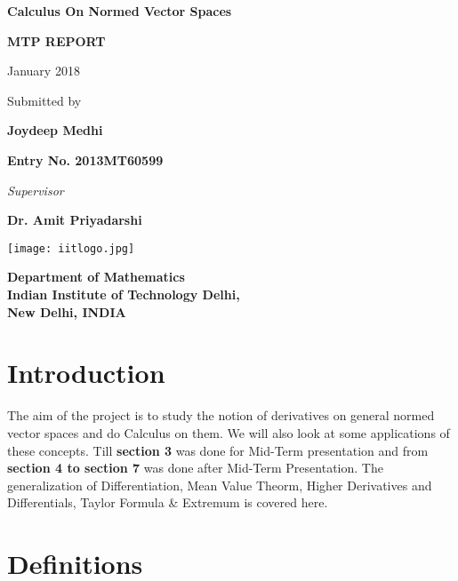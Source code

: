 \documentclass[11 pt]{article}
\theoremstyle{definition}
\theoremstyle{remark}
\begin{document}
\begin{center}
\begin{LARGE}
\textbf {Calculus On Normed Vector Spaces}
\end{LARGE}
\begin{center}
\end{center}
{\begin{Large}
\textbf{MTP REPORT} \\
\end{Large}}
January 2018
\end{center}

\vspace{45mm}
\begin{center}
Submitted by


\textbf{Joydeep Medhi}

\bf Entry No. 2013MT60599
\vspace{15mm}

\textit{Supervisor}

\textbf{Dr. Amit Priyadarshi}

\end{center}
\vspace{3cm}
\begin{center}
\texttt{[image: iitlogo.jpg]}
\end{center}
\begin{center}
\textbf{{Department of Mathematics\\
Indian Institute of Technology Delhi,\\
New Delhi, INDIA}}
\end{center}
\thispagestyle{empty}
\newpage
\thispagestyle{empty}


\section{Introduction}
The aim of the project is to study the notion of derivatives on general normed vector spaces and do Calculus on them. We will also look at some applications of these concepts.
Till \textbf{section 3} was done for Mid-Term presentation and from \textbf{section 4 to section 7} was done after Mid-Term Presentation. The generalization of Differentiation, Mean Value Theorm, Higher Derivatives and Differentials, Taylor Formula & Extremum is covered here. 

\section{Definitions}
\end{document}
